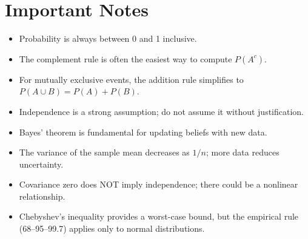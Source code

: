 \documentclass[11pt]{article}
\begin{document}
\section*{Important Notes}
\begin{itemize}[nosep]
    \item Probability is always between 0 and 1 inclusive.
    \item The complement rule is often the easiest way to compute \(P(A^c)\).
    \item For mutually exclusive events, the addition rule simplifies to \(P(A\cup B)=P(A)+P(B)\).
    \item Independence is a strong assumption; do not assume it without justification.
    \item Bayes' theorem is fundamental for updating beliefs with new data.
    \item The variance of the sample mean decreases as \(1/n\); more data reduces uncertainty.
    \item Covariance zero does NOT imply independence; there could be a nonlinear relationship.
    \item Chebyshev's inequality provides a worst-case bound, but the empirical rule (68–95–99.7) applies only to normal distributions.
\end{itemize}
\end{document}
